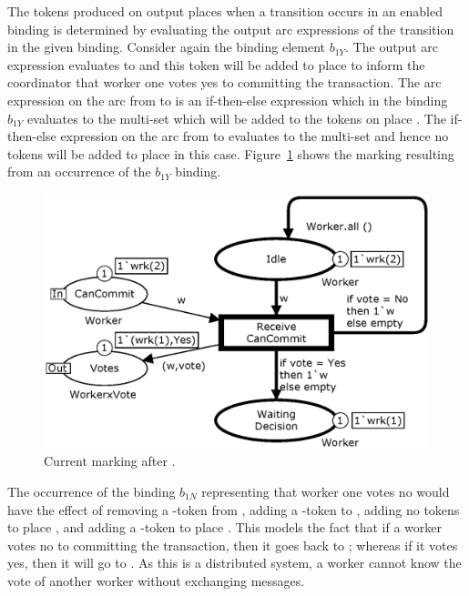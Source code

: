 
The tokens produced on output places when a transition occurs in an
enabled binding is determined by evaluating the output arc expressions
of the transition in the given binding. Consider again the binding
element $b_{1Y}$. The output arc expression 
evaluates to  and this token will be added to
place  to inform the coordinator that worker one votes
yes to committing the transaction. The arc expression on the arc from
 to  is an
if-then-else expression which in the binding $b_{1Y}$ evaluates to the
multi-set  which will be added to the tokens on
place . The if-then-else expression on the
arc from  to  evaluates to the
 multi-set and hence no tokens will be added to place
 in this case. Figure~\ref{fig:receivecancommit} shows
the marking resulting from an occurrence of the $b_{1Y}$ binding.

\begin{figure}[b]
\centering
\includegraphics[scale=.43]{figures/ReceiveCanCommit.eps}
\caption{Current marking after .}
\label{fig:receivecancommit}
\end{figure}

The occurrence of the binding $b_{1N}$ representing that worker one
votes no would have the effect of removing a -token
from , adding a -token to
, adding no tokens to place ,
and adding a -token to place . This
models the fact that if a worker votes no to committing the
transaction, then it goes back to ; whereas if it votes
yes, then it will go to .  As this is a
distributed system, a worker cannot know the vote of another worker
without exchanging messages.

